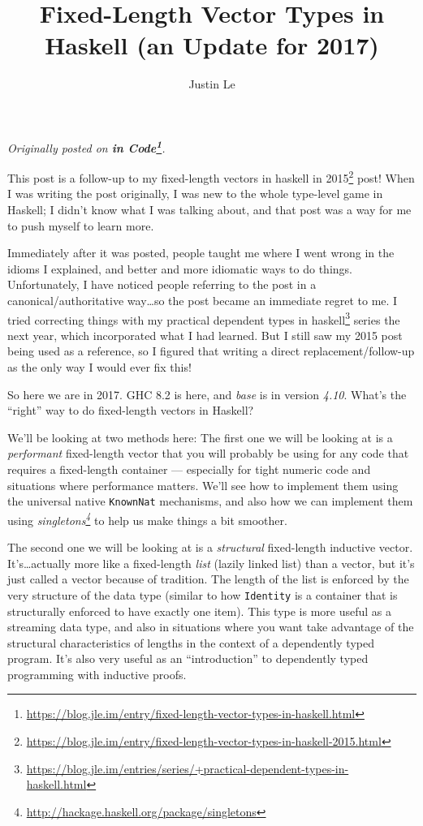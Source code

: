 \documentclass[]{article}
\title{Fixed-Length Vector Types in Haskell (an Update for 2017)}
\author{Justin Le}
\renewcommand{\href}[2]{#2\footnote{\url{#1}}}
\begin{document}
\maketitle

\emph{Originally posted on
\textbf{\href{https://blog.jle.im/entry/fixed-length-vector-types-in-haskell.html}{in
Code}}.}

This post is a follow-up to my
\href{https://blog.jle.im/entry/fixed-length-vector-types-in-haskell-2015.html}{fixed-length
vectors in haskell in 2015} post! When I was writing the post originally, I was
new to the whole type-level game in Haskell; I didn't know what I was talking
about, and that post was a way for me to push myself to learn more.

Immediately after it was posted, people taught me where I went wrong in the
idioms I explained, and better and more idiomatic ways to do things.
Unfortunately, I have noticed people referring to the post in a
canonical/authoritative way\ldots{}so the post became an immediate regret to me.
I tried correcting things with my
\href{https://blog.jle.im/entries/series/+practical-dependent-types-in-haskell.html}{practical
dependent types in haskell} series the next year, which incorporated what I had
learned. But I still saw my 2015 post being used as a reference, so I figured
that writing a direct replacement/follow-up as the only way I would ever fix
this!

So here we are in 2017. GHC 8.2 is here, and \emph{base} is in version
\emph{4.10}. What's the ``right'' way to do fixed-length vectors in Haskell?

We'll be looking at two methods here: The first one we will be looking at is a
\emph{performant} fixed-length vector that you will probably be using for any
code that requires a fixed-length container --- especially for tight numeric
code and situations where performance matters. We'll see how to implement them
using the universal native \texttt{KnownNat} mechanisms, and also how we can
implement them using
\emph{\href{http://hackage.haskell.org/package/singletons}{singletons}} to help
us make things a bit smoother.

The second one we will be looking at is a \emph{structural} fixed-length
inductive vector. It's\ldots{}actually more like a fixed-length \emph{list}
(lazily linked list) than a vector, but it's just called a vector because of
tradition. The length of the list is enforced by the very structure of the data
type (similar to how \texttt{Identity} is a container that is structurally
enforced to have exactly one item). This type is more useful as a streaming data
type, and also in situations where you want take advantage of the structural
characteristics of lengths in the context of a dependently typed program. It's
also very useful as an ``introduction'' to dependently typed programming with
inductive proofs.
\end{document}
